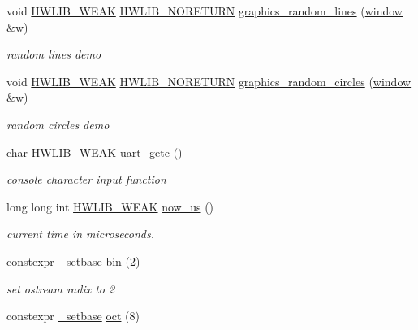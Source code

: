 \begin{DoxyCompactItemize}
\item 
void \hyperlink{hwlib-defines_8hpp_a04be4340016df60d6636c1d1c6d94fc9}{H\+W\+L\+I\+B\+\_\+\+W\+E\+AK} \hyperlink{hwlib-defines_8hpp_aef311f1f416fdcbd1fa22376dcc01029}{H\+W\+L\+I\+B\+\_\+\+N\+O\+R\+E\+T\+U\+RN} \hyperlink{namespacehwlib_ae834adde804bdf781c39695800879a1f}{graphics\+\_\+random\+\_\+lines} (\hyperlink{classhwlib_1_1window}{window} \&w)
\begin{DoxyCompactList}\small\item\em random lines demo \end{DoxyCompactList}\item 
void \hyperlink{hwlib-defines_8hpp_a04be4340016df60d6636c1d1c6d94fc9}{H\+W\+L\+I\+B\+\_\+\+W\+E\+AK} \hyperlink{hwlib-defines_8hpp_aef311f1f416fdcbd1fa22376dcc01029}{H\+W\+L\+I\+B\+\_\+\+N\+O\+R\+E\+T\+U\+RN} \hyperlink{namespacehwlib_a51b02af57df1cd71b9bea0bf5f9fdc63}{graphics\+\_\+random\+\_\+circles} (\hyperlink{classhwlib_1_1window}{window} \&w)
\begin{DoxyCompactList}\small\item\em random circles demo \end{DoxyCompactList}\item 
char \hyperlink{hwlib-defines_8hpp_a04be4340016df60d6636c1d1c6d94fc9}{H\+W\+L\+I\+B\+\_\+\+W\+E\+AK} \hyperlink{namespacehwlib_a0f433c14b5302d476ed723a38862d9d3}{uart\+\_\+getc} ()
\begin{DoxyCompactList}\small\item\em console character input function \end{DoxyCompactList}\item 
long long int \hyperlink{hwlib-defines_8hpp_a04be4340016df60d6636c1d1c6d94fc9}{H\+W\+L\+I\+B\+\_\+\+W\+E\+AK} \hyperlink{namespacehwlib_aa96fdf113860b88c1d99f4152c7bf28f}{now\+\_\+us} ()
\begin{DoxyCompactList}\small\item\em current time in microseconds. \end{DoxyCompactList}\item 
constexpr \hyperlink{structhwlib_1_1__setbase}{\+\_\+setbase} \hyperlink{namespacehwlib_a2f624a643c9c8d30b5e4f3dca914e28e}{bin} (2)
\begin{DoxyCompactList}\small\item\em set ostream radix to 2 \end{DoxyCompactList}\item 
constexpr \hyperlink{structhwlib_1_1__setbase}{\+\_\+setbase} \hyperlink{namespacehwlib_a9711974fb746e16a55e130b461cad619}{oct} (8)

\end{DoxyCompactItemize}
